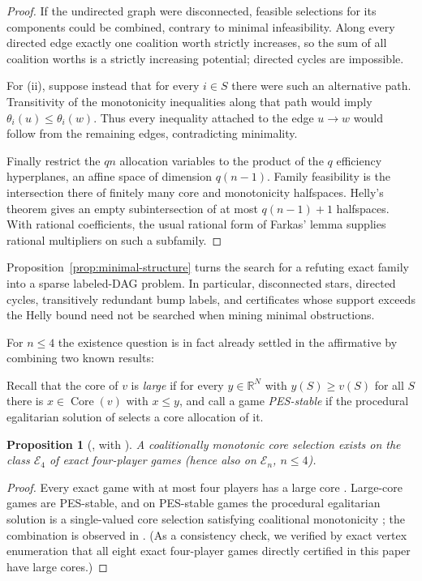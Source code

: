 \documentclass[11pt]{article}
\newtheorem{proposition}[theorem]{Proposition}
\newcommand{\R}{\mathbb{R}}
\newcommand{\core}{\operatorname{Core}}
\begin{document}
\begin{proof}
If the undirected graph were disconnected, feasible selections for its
components could be combined, contrary to minimal infeasibility. Along every
directed edge exactly one coalition worth strictly increases, so the sum of
all coalition worths is a strictly increasing potential; directed cycles are
impossible.

For (ii), suppose instead that for every $i\in S$ there were such an
alternative path. Transitivity of the monotonicity inequalities along that
path would imply $\theta_i(u)\leq\theta_i(w)$. Thus every inequality attached
to the edge $u\to w$ would follow from the remaining edges, contradicting
minimality.

Finally restrict the $qn$ allocation variables to the product of the $q$
efficiency hyperplanes, an affine space of dimension $q(n-1)$. Family
feasibility is the intersection there of finitely many core and monotonicity
halfspaces. Helly's theorem gives an empty subintersection of at most
$q(n-1)+1$ halfspaces. With rational coefficients, the usual rational form
of Farkas' lemma supplies rational multipliers on such a subfamily.
\end{proof}

Proposition~\ref{prop:minimal-structure} turns the search for a refuting exact
family into a sparse labeled-DAG problem. In particular, disconnected stars,
directed cycles, transitively redundant bump labels, and certificates whose
support exceeds the Helly bound need not be searched when mining minimal
obstructions.

For $n\le 4$ the existence question is in fact already settled in the
affirmative by combining two known results:

Recall that the core of $v$ is \emph{large} \citep{Sharkey82} if for
every $y\in\R^N$ with $y(S)\ge v(S)$ for all $S$ there is
$x\in\core(v)$ with $x\le y$, and call a game \emph{PES-stable} if the
procedural egalitarian solution of \citet{Dietzenbacher2021} selects a
core allocation of it.

\begin{proposition}[\citealp{Dietzenbacher2021}, with \citealp{Biswas99}]
\label{prop:n4}
A coalitionally monotonic core selection exists on the class
$\mathcal{E}_4$ of exact four-player games (hence also on $\mathcal{E}_n$,
$n\le 4$).
\end{proposition}

\begin{proof}
Every exact game with at most four players has a large core
\citep{Biswas99}. Large-core games are PES-stable, and on PES-stable games
the procedural egalitarian solution is a single-valued core selection
satisfying coalitional monotonicity \citep{Dietzenbacher2021}; the
combination is observed in \citet{Dietzenbacher2021}. (As a consistency
check, we verified by exact vertex enumeration that all eight exact
four-player games directly certified in this paper have large cores.)
\end{proof}
\end{document}
